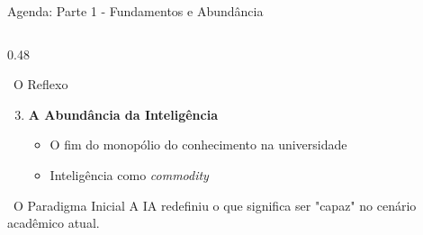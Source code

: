 \documentclass[aspectratio=169,12pt]{beamer}
\begin{document}
\begin{frame}[shrink]{Agenda: Parte 1 - Fundamentos e Abundância}
\begin{columns}[T]
        \begin{column}{0.48\textwidth}
            \begin{block}{\faListOl\, O Reflexo}
                \begin{enumerate}
                    \setcounter{enumi}{2}
                    \item \textbf{A Abundância da Inteligência}
                    \begin{itemize}
                        \item O fim do monopólio do conhecimento na universidade
                        \item Inteligência como \textit{commodity}
                    \end{itemize}
                \end{enumerate}
            \end{block}
            \vspace{0.5cm}
            \begin{exampleblock}{\faLightbulb\, O Paradigma Inicial}
                \centering
                A IA redefiniu o que significa ser "capaz" no cenário acadêmico atual.
            \end{exampleblock}
        \end{column}
    \end{columns}
\end{frame}
\end{document}
